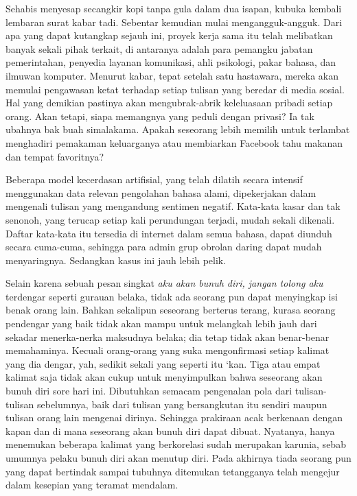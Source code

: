 \documentclass[smalldemyvopaper,11pt,twoside,onecolumn,openright,extrafontsizes]{memoir}
\begin{document}

Sehabis menyesap secangkir kopi tanpa gula dalam dua isapan, kubuka kembali lembaran surat kabar tadi. Sebentar kemudian mulai mengangguk-angguk. Dari apa yang dapat kutangkap sejauh ini, proyek kerja sama itu telah melibatkan banyak sekali pihak terkait, di antaranya adalah para pemangku jabatan pemerintahan, penyedia layanan komunikasi, ahli psikologi, pakar bahasa, dan ilmuwan komputer. Menurut kabar, tepat setelah satu hastawara, mereka akan memulai pengawasan ketat terhadap setiap tulisan yang beredar di media sosial. Hal yang demikian pastinya akan mengubrak-abrik keleluasaan pribadi setiap orang. Akan tetapi, siapa memangnya yang peduli dengan privasi? Ia tak ubahnya bak buah simalakama. Apakah seseorang lebih memilih untuk terlambat menghadiri pemakaman keluarganya atau membiarkan Facebook tahu makanan dan tempat favoritnya?



Beberapa model kecerdasan artifisial, yang telah dilatih secara intensif menggunakan data relevan pengolahan bahasa alami, dipekerjakan dalam mengenali tulisan yang mengandung sentimen negatif. Kata-kata kasar dan tak senonoh, yang terucap setiap kali perundungan terjadi, mudah sekali dikenali. Daftar kata-kata itu tersedia di internet dalam semua bahasa, dapat diunduh secara cuma-cuma, sehingga para admin grup obrolan daring dapat mudah menyaringnya. Sedangkan kasus ini jauh lebih pelik.


Selain karena sebuah pesan singkat \textit{aku akan bunuh diri, jangan tolong aku} terdengar seperti gurauan belaka, tidak ada seorang pun dapat menyingkap isi benak orang lain. Bahkan sekalipun seseorang berterus terang, kurasa seorang pendengar yang baik tidak akan mampu untuk melangkah lebih jauh dari sekadar menerka-nerka maksudnya belaka; dia tetap tidak akan benar-benar memahaminya. Kecuali orang-orang yang suka mengonfirmasi setiap kalimat yang dia dengar, yah, sedikit sekali yang seperti itu `kan. Tiga atau empat kalimat saja tidak akan cukup untuk menyimpulkan bahwa seseorang akan bunuh diri sore hari ini. Dibutuhkan semacam pengenalan pola dari tulisan-tulisan sebelumnya, baik dari tulisan yang bersangkutan itu sendiri maupun tulisan orang lain mengenai dirinya. Sehingga prakiraan acak berkenaan dengan kapan dan di mana seseorang akan bunuh diri dapat dibuat. Nyatanya, hanya menemukan beberapa kalimat yang berkorelasi sudah merupakan karunia, sebab umumnya pelaku bunuh diri akan menutup diri. Pada akhirnya tiada seorang pun yang dapat bertindak sampai tubuhnya ditemukan tetangganya telah mengejur dalam kesepian yang teramat mendalam.
\end{document}
